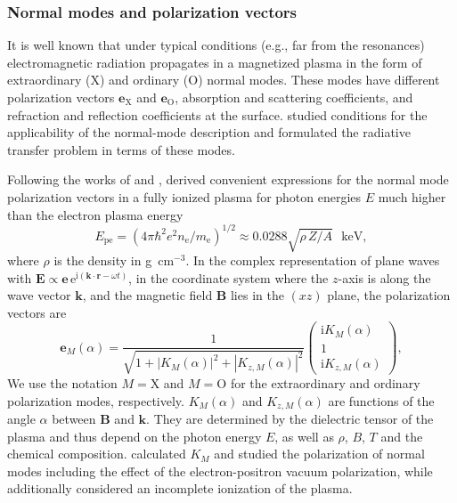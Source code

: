 \documentclass{aa}
\newcommand{\beq}{\begin{equation}}
\newcommand{\eeq}{\end{equation}}
\newcommand{\Epe}{E_\mathrm{pe}}
\newcommand{\eO}{{\bm{e}}_\mathrm{O}}
\newcommand{\eX}{{\bm{e}}_\mathrm{X}}
\newcommand{\gcc}{\mbox{g cm$^{-3}$}}
\newcommand{\mel}{m_\mathrm{e}} %
\begin{document}
\subsubsection{Normal modes and polarization vectors}
\label{sect:NM}

It is well known \citep[e.g.,][]{Ginzburg} that under
typical conditions (e.g., far from the resonances) 
electromagnetic radiation propagates in a magnetized plasma in
the form of extraordinary (X) and ordinary (O) normal
modes.  These modes have different polarization vectors
$\eX$ and $\eO$, absorption
and scattering coefficients, and refraction and
reflection coefficients at the surface.
\citet{GP73} studied conditions for the
applicability of the normal-mode description
and formulated the radiative transfer
problem in terms of these modes.

Following the works of \citet{Shafranov} and
\citet{Ginzburg}, \citet{HoLai01} derived convenient
expressions for the normal mode polarization vectors in a
fully ionized plasma for photon energies $E$ much higher
than the electron plasma energy
\beq
   \Epe =\left({4\pi\hbar^2 e^2 n_\mathrm{e} 
                      / \mel} \right)^{1/2}
                      \approx 0.0288\sqrt{\rho\, Z/A} 
                      \textrm{~~keV},
\label{Epe}
\eeq
where $\rho$ is the density in \gcc.
In the complex representation of plane waves with 
$\bm{E} \propto \bm{e}\,
\mathrm{e}^{\mathrm{i}(\bm{k}\cdot\bm{r}-\omega t)}$,
in the coordinate system where the $z$-axis is along the
wave vector $\bm{k}$, and the magnetic field $\bm{B}$ lies
in the $(xz)$ plane, 
the polarization vectors
are
\beq
   \bm{e}_M(\alpha) = \frac{1}{\sqrt{1+|K_M(\alpha)|^2
 + |K_{z,M}(\alpha)|^2}}
 \left( \begin{array}{c}
     \mathrm{i} K_M(\alpha) \\  1  \\  \mathrm{i} K_{z,M}(\alpha)
     \end{array}
     \right),
\label{e'}
\eeq
We use the notation $M=\mathrm{X}$ and $M=\mathrm{O}$ for
the extraordinary and ordinary polarization modes,
respectively. $K_M(\alpha)$ and $K_{z,M}(\alpha)$ are
functions of the angle $\alpha$ between $\bm{B}$ and
$\bm{k}$. They are determined by the dielectric tensor of
the plasma and thus depend on the photon energy $E$, as
well as $\rho$, $B$, $T$ and the chemical composition.
\citet{HoLai03} calculated $K_M$ and studied the polarization
of normal modes including the effect
of the electron-positron vacuum polarization, while
\citet{Potekhin-ea04} additionally considered an incomplete
ionization of the plasma.
\end{document}
